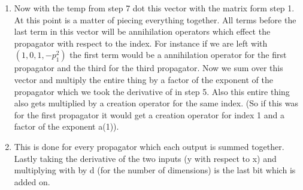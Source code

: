 \documentclass[preprintnumbers,superscriptaddress,nofootinbib,aps,prd,floatfix]{revtex4}
\newcommand{\tb}{\textbf}
\begin{document}
\begin{center}
\begin{enumerate}
\item Now with the temp from step 7 dot this vector with the matrix form step 1. At this point is a matter of piecing everything together. All terms before the last term in this vector will be annihilation operators which effect the propagator with respect to the index. For instance if we are left with $(1,0,1,-p_1^2)$ the first term would be a annihilation operator for the first propagator and the third for the third propagator. Now we sum over this vector and multiply the entire thing by a factor of the exponent of the propagator which we took the derivative of in step 5. Also this entire thing also gets multiplied by a creation operator for the same index. (So if this was for the first propagator it would get a creation operator for index 1 and a factor of the exponent a(1)). 
\item This is done for every propagator which each output is summed together. Lastly taking the derivative of the two inputs (y with respect to x) and multiplying with by d (for the number of dimensions) is the last bit which is added on. 
\end{enumerate}
\end{center}



\tb{}
 
 


\end{document}

